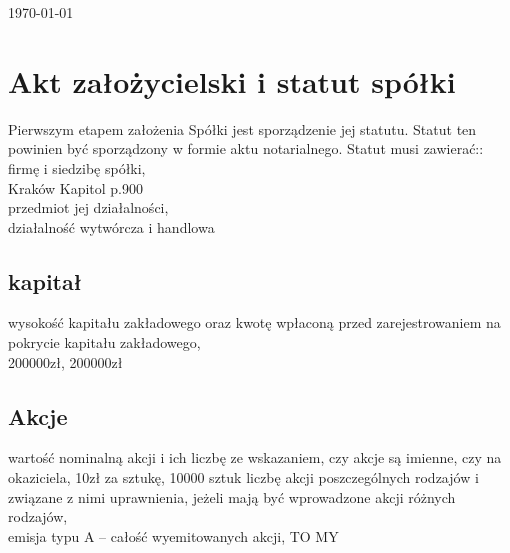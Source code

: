 \documentclass[a4paper, 11pt]{article}
\begin{document}
\begin{titlepage}
		
		
		{\large \today}\\[3cm] %
		
		
		
		
		\vfill %
		
	\end{titlepage}
	
	
	\tableofcontents
	\vfill

	\section{Akt założycielski i statut spółki}
Pierwszym etapem założenia Spółki jest sporządzenie jej statutu. Statut ten powinien być sporządzony w formie aktu notarialnego. Statut musi zawierać::\\
firmę i siedzibę spółki,\\
Kraków Kapitol p.900\\
przedmiot jej działalności,\\
działalność wytwórcza i handlowa\\
\subsection{kapitał}
wysokość kapitału zakładowego oraz kwotę wpłaconą przed zarejestrowaniem na pokrycie kapitału zakładowego,\\
200000zł, 200000zł
\subsection{Akcje}
wartość nominalną akcji i ich liczbę ze wskazaniem, czy akcje są imienne, czy na okaziciela,
10zł za sztukę, 10000 sztuk
liczbę akcji poszczególnych rodzajów i związane z nimi uprawnienia, jeżeli mają być wprowadzone akcji różnych rodzajów,\\
emisja typu A – całość wyemitowanych akcji, TO MY\\
				
\end{document}

